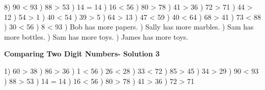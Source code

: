 \documentclass{article}%
\begin{document}
8) 90 < 93%
) 88 > 53%
) 14 = 14%
) 16 < 56%
) 80 > 78%
) 41 > 36%
) 72 > 71%
) 44 > 12%
) 54 > 1%
) 40 < 54%
) 39 > 5%
) 64 > 13%
) 47 < 59%
) 40 < 64%
) 68 > 41%
) 73 < 88%
) 30 < 56%
) 8 < 93%
) Bob has more papers.%
) Sally has more marbles.%
) Sam has more bottles.%
) Sam has more toys.%
) James has more toys.%
\newline%
\newpage%
\large%
\begin{center}%
\textbf{Comparing Two Digit Numbers- Solution 3}%
\newline%
\end{center} \normalsize%
1) 60 > 38%
) 86 > 36%
) 1 < 56%
) 26 < 28%
) 33 < 72%
) 85 > 45%
) 34 > 29%
) 90 < 93%
) 88 > 53%
) 14 = 14%
) 16 < 56%
) 80 > 78%
) 41 > 36%
) 72 > 71%
\newline%
\end{document}
